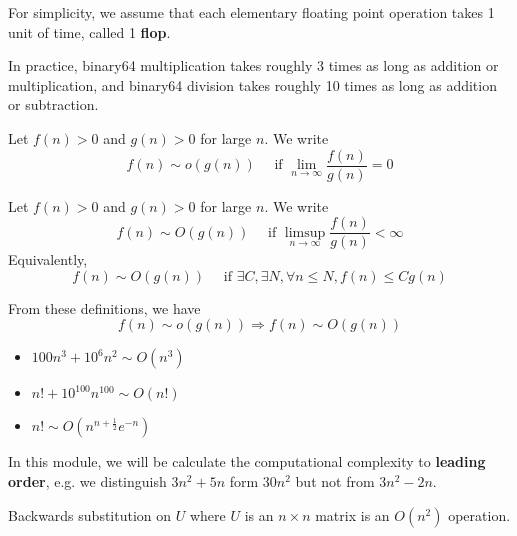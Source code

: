 \begin{definition}
	For simplicity, we assume that each elementary floating point operation takes 1 unit of time, called 1 \textbf{flop}.
\end{definition}

\begin{remark}
	In practice, binary64 multiplication takes roughly 3 times as long as addition or multiplication, and binary64 division takes roughly 10 times as long as addition or subtraction.
\end{remark}

\begin{definition}
	Let $f(n) > 0$ and $g(n) > 0$ for large $n$. We write
	\[
		f(n) \sim o(g(n)) \quad \text{ if } \lim_{n \rightarrow \infty} \frac{f(n)}{g(n)} = 0
	\]
\end{definition}

\begin{definition}
	Let $f(n) > 0$ and $g(n) > 0$ for large $n$. We write
	\[
		f(n) \sim O(g(n)) \quad \text{ if } \limsup_{n \rightarrow \infty} \frac{f(n)}{g(n)} < \infty
	\]
	Equivalently,
	\[
		f(n) \sim O(g(n)) \quad \text{ if } \exists C, \exists N, \forall n \le N, f(n) \le C g(n)
	\]
\end{definition}

\begin{remark}
	From these definitions, we have
	\[
		f(n) \sim o(g(n)) \Longrightarrow f(n) \sim O(g(n))
	\]
\end{remark}

\begin{example}
	\hfill
	\begin{itemize}
		\item $100n^3 + 10^6 n^2 \sim O(n^3)$
		\item $n! + 10^{100} n^{100} \sim O(n!)$
		\item $n! \sim O(n^{n + \frac{1}{2}} e^{-n})$
	\end{itemize}
\end{example}

\begin{remark}
	In this module, we will be calculate the computational complexity to \textbf{leading order}, e.g. we distinguish $3n^2 + 5n$ form $30n^2$ but not from $3n^2 - 2n$.
\end{remark}

\begin{proposition}
	Backwards substitution on $U$ where $U$ is an $n \times n$ matrix is an $O(n^2)$ operation.
\end{proposition}

